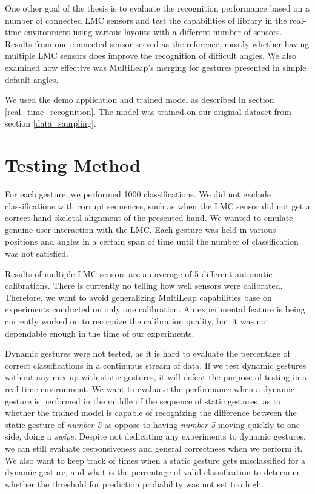 
One other goal of the thesis is to evaluate the recognition performance based on a number of connected LMC sensors and test the capabilities of  library in the real-time environment using various layouts with a different number of sensors. Results from one connected sensor served as the reference, mostly whether having multiple LMC sensors does improve the recognition of difficult angles. We also examined how effective was MultiLeap's merging for gestures presented in simple default angles.

We used the demo application and trained model as described in section \ref{real_time_recognition}. The model was trained on our original dataset from section \ref{data_sampling}. 

\section{Testing Method}

For each gesture, we performed 1000 classifications. We did not exclude classifications with corrupt sequences, such as when the LMC sensor did not get a correct hand skeletal alignment of the presented hand. We wanted to emulate genuine user interaction with the LMC. Each gesture was held in various positions and angles in a certain span of time until the number of classification was not satisfied. 

Results of multiple LMC sensors are an average of 5 different automatic calibrations. There is currently no telling how well sensors were calibrated. Therefore, we want to avoid generalizing MultiLeap capabilities base on experiments conducted on only one calibration. An experimental feature is being currently worked on to recognize the calibration quality, but it was not dependable enough in the time of our experiments.

Dynamic gestures were not tested, as it is hard to evaluate the percentage of correct classifications in a continuous stream of data. If we test dynamic gestures without any mix-up with static gestures, it will defeat the purpose of testing in a real-time environment. We want to evaluate the performance when a dynamic gesture is performed in the middle of the sequence of static gestures, as to whether the trained model is capable of recognizing the difference between the static gesture of \textit{number 5} as oppose to having \textit{number 5} moving quickly to one side, doing a \textit{swipe}. Despite not dedicating any experiments to dynamic gestures, we can still evaluate responsiveness and general correctness when we perform it. We also want to keep track of times when a static gesture gets misclassified for a dynamic gesture, and what is the percentage of valid classification to determine whether the threshold for prediction probability was not set too high.



